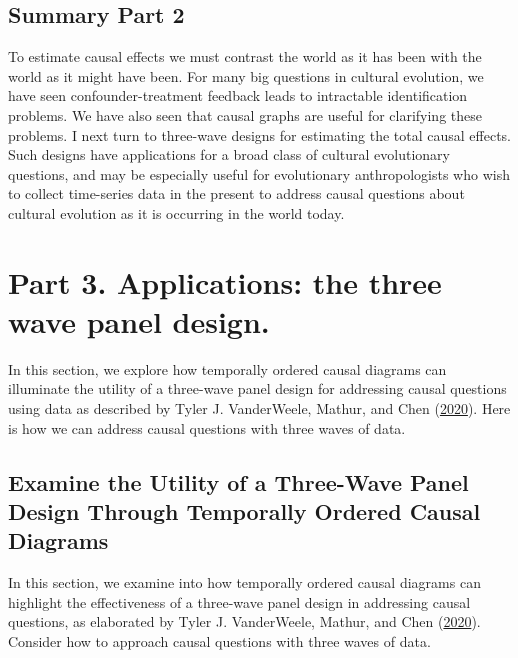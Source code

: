 \documentclass[
  singlecolumn]{report}
\begin{document}
\hypertarget{summary-part-2}{%
\subsection{Summary Part 2}\label{summary-part-2}}

To estimate causal effects we must contrast the world as it has been
with the world as it might have been. For many big questions in cultural
evolution, we have seen confounder-treatment feedback leads to
intractable identification problems. We have also seen that causal
graphs are useful for clarifying these problems. I next turn to
three-wave designs for estimating the total causal effects. Such designs
have applications for a broad class of cultural evolutionary questions,
and may be especially useful for evolutionary anthropologists who wish
to collect time-series data in the present to address causal questions
about cultural evolution as it is occurring in the world today.

\hypertarget{part-3.-applications-the-three-wave-panel-design.}{%
\section{Part 3. Applications: the three wave panel
design.}\label{part-3.-applications-the-three-wave-panel-design.}}

In this section, we explore how temporally ordered causal diagrams can
illuminate the utility of a three-wave panel design for addressing
causal questions using data as described by Tyler J. VanderWeele,
Mathur, and Chen (\protect\hyperlink{ref-vanderweele2020}{2020}). Here
is how we can address causal questions with three waves of data.

\hypertarget{examine-the-utility-of-a-three-wave-panel-design-through-temporally-ordered-causal-diagrams}{%
\subsection{\texorpdfstring{\textbf{Examine the Utility of a Three-Wave
Panel Design Through Temporally Ordered Causal
Diagrams}}{Examine the Utility of a Three-Wave Panel Design Through Temporally Ordered Causal Diagrams}}\label{examine-the-utility-of-a-three-wave-panel-design-through-temporally-ordered-causal-diagrams}}

In this section, we examine into how temporally ordered causal diagrams
can highlight the effectiveness of a three-wave panel design in
addressing causal questions, as elaborated by Tyler J. VanderWeele,
Mathur, and Chen (\protect\hyperlink{ref-vanderweele2020}{2020}).
Consider how to approach causal questions with three waves of data.
\end{document}
